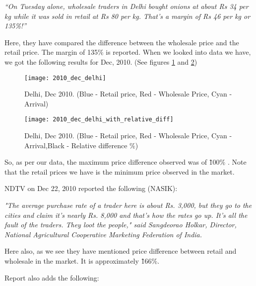 \textit{“On Tuesday alone, wholesale traders in Delhi bought onions at about Rs 34 per kg while it was sold in retail at Rs 80 per kg. That's a margin of Rs 46 per kg or 135\%!” } 

Here, they have compared the difference between the wholesale price and the retail price. The margin of 135\% is reported. When we looked into data we have, we got the following results for Dec, 2010. (See figures \ref{fig:DelhiDec2010} and \ref{fig:DelhiDec2010Relativedifference})

\begin{figure}[here]
\begin{center}	
\texttt{[image: 2010\_dec\_delhi]} 
\caption{Delhi, Dec 2010. (Blue - Retail price, Red - Wholesale Price, Cyan - Arrival)}
\label{fig:DelhiDec2010}
\end{center}
\end{figure}

\begin{figure}[here]
\begin{center}	
\texttt{[image: 2010\_dec\_delhi\_with\_relative\_diff]} 
\caption{Delhi, Dec 2010. (Blue - Retail price, Red - Wholesale Price, Cyan - Arrival,Black - Relative difference \%)}
\label{fig:DelhiDec2010Relativedifference}
\end{center}
\end{figure}

So, as per our data, the maximum price difference observed was of \~ 100\% . Note that the retail prices we have is the minimum price observed in the market.

NDTV on Dec 22, 2010 reported the following (NASIK):

\textit{ "The average purchase rate of a trader here is about Rs. 3,000, but they go to the cities and claim it's nearly Rs. 8,000 and that's how the rates go up. It's all the fault of the traders. They loot the people," said Sangdeorao Holkar, Director, National Agricultural Cooperative Marketing Federation of India.}

Here also, as we see they have mentioned price difference between retail and wholesale in the market. It is approximately \~166\%.

Report also adds the following:

